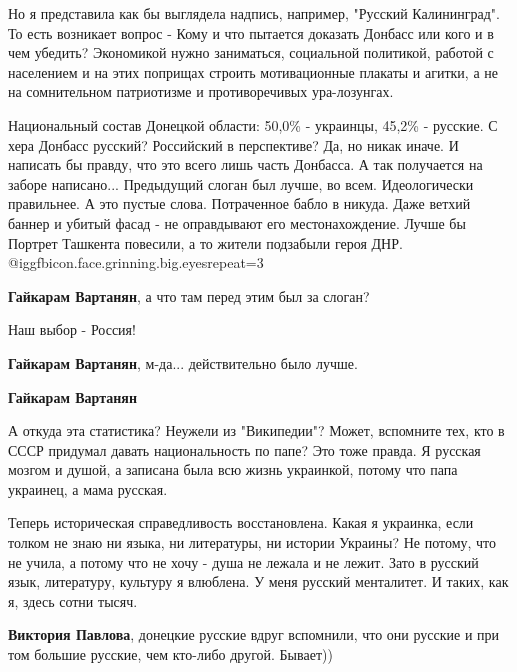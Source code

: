 \begin{itemize}
\begin{itemize}
Но я представила как бы выглядела надпись, например, "Русский Калининград". То
есть возникает вопрос - Кому и что пытается доказать Донбасс или кого и в чем
убедить? Экономикой нужно заниматься, социальной политикой, работой с
населением и на этих поприщах строить мотивационные плакаты и агитки, а не на
сомнительном патриотизме и противоречивых ура-лозунгах.

\end{itemize} %


Национальный состав Донецкой области: 50,0\% - украинцы, 45,2\% - русские. С хера
Донбасс русский? Российский в перспективе? Да, но никак иначе. И написать бы
правду, что это всего лишь часть Донбасса. А так получается на заборе
написано... Предыдущий слоган был лучше, во всем. Идеологически правильнее. А
это пустые слова. Потраченное бабло в никуда. Даже ветхий баннер и убитый фасад
- не оправдывают его местонахождение. Лучше бы Портрет Ташкента повесили, а то
жители подзабыли героя ДНР.  @igg{fbicon.face.grinning.big.eyes}{repeat=3} 

\begin{itemize} %
\textbf{Гайкарам Вартанян}, а что там перед этим был за слоган?

Наш выбор - Россия!

\textbf{Гайкарам Вартанян}, м-да... действительно было лучше.


\textbf{Гайкарам Вартанян} 

А откуда эта статистика? Неужели из "Википедии"? Может, вспомните тех, кто в
СССР придумал давать национальность по папе? Это тоже правда. Я русская мозгом
и душой, а записана была всю жизнь украинкой, потому что папа украинец, а мама
русская.

Теперь историческая справедливость восстановлена. Какая я украинка, если толком
не знаю ни языка, ни литературы, ни истории Украины? Не потому, что не учила, а
потому что не хочу - душа не лежала и не лежит. Зато в русский язык,
литературу, культуру я влюблена. У меня русский менталитет. И таких, как я,
здесь сотни тысяч.

\textbf{Виктория Павлова}, донецкие русские вдруг вспомнили, что они русские и при том большие русские, чем кто-либо другой. Бывает))


\end{itemize}
\end{itemize}
